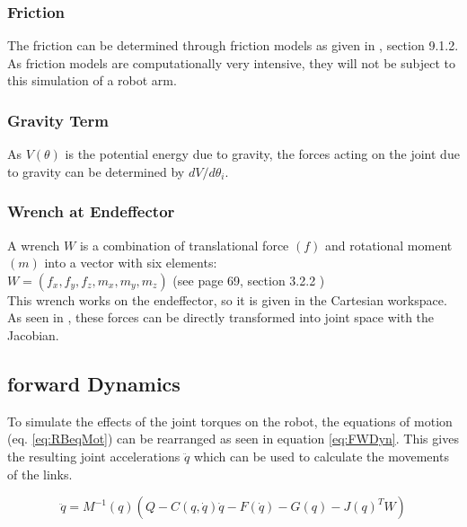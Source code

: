 \subsubsection{Friction }
The friction can be determined through friction models as given in  \cite{CorkeRoboticVisionControl}, section 9.1.2.
As friction models are computationally very intensive, they will not be subject to this simulation of a robot arm.

\subsubsection{Gravity Term}
As  $V (\theta)$ is the potential energy due to gravity, the forces acting on the joint due to gravity can be determined by $dV/d\theta_i$. %

\subsubsection{Wrench at Endeffector }
A wrench $W$ is a combination of translational force $(f)$ and rotational moment $(m)$ into a vector with six elements:\\
$ W = (f_x, f_y, f_z, m_x, m_y, m_z)$ (see page 69, section 3.2.2 \cite{CorkeRoboticVisionControl})\\
This wrench works on the endeffector, so it is given in the Cartesian workspace.
As seen in , these forces can be directly transformed into joint space with the Jacobian.









\subsection{forward Dynamics}
To simulate the effects of the joint torques on the robot, the equations of motion (eq. \ref{eq:RBeqMot}) can be rearranged as seen in equation \ref{eq:FWDyn}. This gives the resulting joint accelerations $\ddot{q}$ which can be used to calculate the movements of the links.

\begin{equation} \label{eq:FWDyn}
	\ddot{q}= M^{-1}(q) (Q-C(q,\dot{q})\dot{q} - F(\dot{q}) -G(q) -J(q)^T W)
\end{equation}